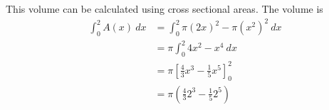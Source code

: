\documentclass[11pt, addpoints]{exam}
\begin{document}
\begin{questions}
This volume can be calculated using cross sectional areas. The volume is
\begin{align*}
    \int_0^2 A(x) \ dx & = \int_0^2 \pi (2x)^2 - \pi (x^2)^2 \ dx\\
    & = \pi \int_0^2 4x^2 - x^4 \ dx \\
    & = \pi\left[\frac{4}{3} x^3 - \frac{1}{5}x^5\right]_0^2 \\
    & = \pi\left(\frac{4}{3}2^3 - \frac{1}{5}2^5\right)
\end{align*}
\end{questions}
    
\end{document}
